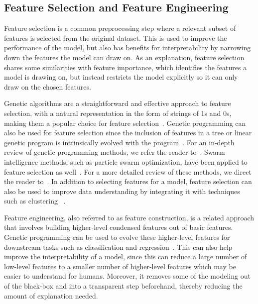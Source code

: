 \documentclass[graybox]{svmult}
\begin{document}
\subsection{Feature Selection and Feature Engineering}
Feature selection is a common preprocessing step where a relevant subset of features is selected from the original dataset. This is used to improve the performance of the model, but also has benefits for interpretability by narrowing down the features the model can draw on. As an explanation, feature selection shares some similarities with feature importance, which identifies the features a model is drawing on, but instead restricts the model explicitly so it can only draw on the chosen features.

Genetic algorithms are a straightforward and effective approach to feature selection, with a natural representation in the form of strings of 1s and 0s, making them a popular choice for feature selection~\cite{sayedNestedGeneticAlgorithm2019, shaFeatureSelectionPolygenic2021,xueMultiObjectiveFeatureSelection2022}. 
Genetic programming can also be used for feature selection since the inclusion of features in a tree or linear genetic program is intrinsically evolved with the program~\cite{GPinterpret_Hu_GPTP_20,EvoNetOA_Hu_PLOSCB_18,SMILE_Sha_BMCBio_21}.
For an in-depth review of genetic programming methods, we refer the reader to~\cite{xueSurveyEvolutionaryComputation2016}. Swarm intelligence methods, such as particle swarm optimization, have been applied to feature selection as well~\cite{xueSelfadaptiveParticleSwarm2019}. For a more detailed review of these methods, we direct the reader to~\cite{nguyenSurveySwarmIntelligence2020}. In addition to selecting features for a model, feature selection can also be used to improve data understanding by integrating it with techniques such as clustering ~\cite{hancerSurveyFeatureSelection2020}.


Feature engineering, also referred to as feature construction, is a related approach that involves building higher-level condensed features out of basic features. Genetic programming can be used to evolve these higher-level features for downstream tasks such as classification and regression~\cite{lacavaLearningFeatureSpaces2020,GP-FE_Li_BIBM_20, muharramEvolutionaryConstructiveInduction2005, virgolinExplainingMachineLearning2020}. This can also help improve the interpretability of a model, since this can reduce a large number of low-level features to a smaller number of higher-level features which may be easier to understand for humans. Moreover, it removes some of the modeling out of the black-box and into a transparent step beforehand, thereby reducing the amount of explanation needed.
\end{document}
